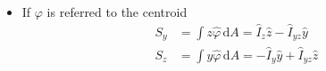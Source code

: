 \begin{itemize}
\tightlist
\item
  If \(\varphi\) is referred to the centroid 
  \[
  \begin{aligned}
  S_y &= \int z \hat{\varphi} \, \mathrm{d} A =   \hat{I}_{z} \hat{z} - \hat{I}_{yz} \hat{y} \\
  S_z &= \int y \hat{\varphi} \, \mathrm{d} A = - \hat{I}_{y} \hat{y} + \hat{I}_{yz} \hat{z}
  \end{aligned}
  \]
\end{itemize}
